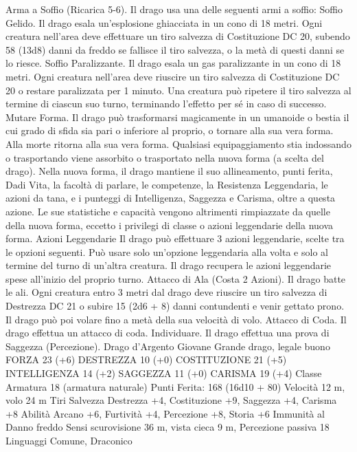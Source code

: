 \begin{multicols}{2}
Arma a Soffio (Ricarica 5-6). Il drago usa una delle seguenti armi
a soffio:
Soffio Gelido. Il drago esala un’esplosione ghiacciata in un cono di
18 metri. Ogni creatura nell’area deve effettuare un tiro salvezza di
Costituzione DC 20, subendo 58 (13d8) danni da freddo se fallisce il
tiro salvezza, o la metà di questi danni se lo riesce.
Soffio Paralizzante. Il drago esala un gas paralizzante in un cono di
18 metri. Ogni creatura nell’area deve riuscire un tiro salvezza di
Costituzione DC 20 o restare paralizzata per 1 minuto. Una creatura
può ripetere il tiro salvezza al termine di ciascun suo turno,
terminando l’effetto per sé in caso di successo.
Mutare Forma. Il drago può trasformarsi magicamente in un
umanoide o bestia il cui grado di sfida sia pari o inferiore al proprio,
o tornare alla sua vera forma. Alla morte ritorna alla sua vera forma.
Qualsiasi equipaggiamento stia indossando o trasportando viene
assorbito o trasportato nella nuova forma (a scelta del drago).
Nella nuova forma, il drago mantiene il suo allineamento, punti
ferita, Dadi Vita, la facoltà di parlare, le competenze, la Resistenza
Leggendaria, le azioni da tana, e i punteggi di Intelligenza, Saggezza
e Carisma, oltre a questa azione. Le sue statistiche e capacità
vengono altrimenti rimpiazzate da quelle della nuova forma, eccetto i
privilegi di classe o azioni leggendarie della nuova forma.
Azioni Leggendarie
Il drago può effettuare 3 azioni leggendarie, scelte tra le opzioni
seguenti. Può usare solo un’opzione leggendaria alla volta e solo
al termine del turno di un’altra creatura. Il drago recupera le
azioni leggendarie spese all’inizio del proprio turno.
Attacco di Ala (Costa 2 Azioni). Il drago batte le ali. Ogni
creatura entro 3 metri dal drago deve riuscire un tiro salvezza di
Destrezza DC 21 o subire 15 (2d6 + 8) danni contundenti e venir
gettato prono. Il drago può poi volare fino a metà della sua
velocità di volo.
Attacco di Coda. Il drago effettua un attacco di coda.
Individuare. Il drago effettua una prova di Saggezza
(Percezione).
Drago d’Argento Giovane
Grande drago, legale buono
FORZA 23 (+6)
DESTREZZA 10 (+0)
COSTITUZIONE 21 (+5)
INTELLIGENZA 14 (+2)
SAGGEZZA 11 (+0)
CARISMA 19 (+4)
Classe Armatura 18 (armatura naturale)
\hspace*{0pt}\hfill{Punti Ferita}: 168 (16d10 + 80)
Velocità 12 m, volo 24 m
Tiri Salvezza Destrezza +4, Costituzione +9, Saggezza +4,
Carisma +8
Abilità Arcano +6, Furtività +4, Percezione +8, Storia +6
Immunità al Danno freddo
Sensi scurovisione 36 m, vista cieca 9 m, Percezione passiva 18
Linguaggi Comune, Draconico

\end{multicols}
